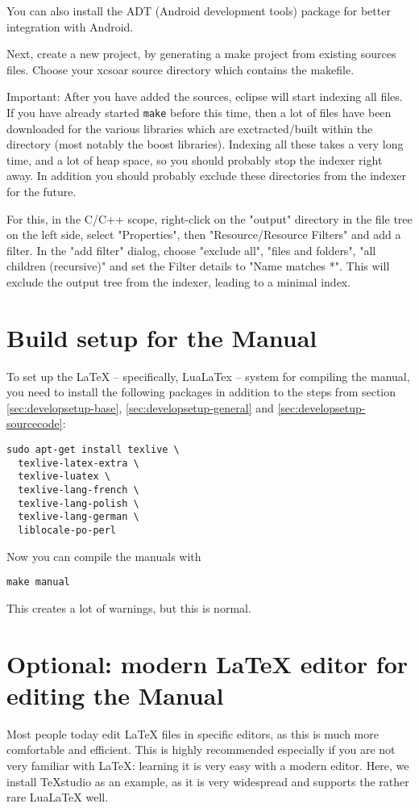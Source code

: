 You can also install the ADT (Android development tools) package for better integration with Android.

Next, create a new project, by generating a make project from existing sources files. Choose your xcsoar source directory which contains the makefile.

Important: After you have added the sources, eclipse will start indexing all files. If you have already started \texttt{make} before this time, then a lot of files have been downloaded for the various libraries which are exctracted/built within the \xc directory (most notably the boost libraries). Indexing all these takes a very long time, and a lot of heap space, so you should probably stop the indexer right away. In addition you should probably exclude these directories from the indexer for the future.

For this, in the C/C++ scope, right-click on the "output" directory in the file tree on the left side, select "Properties", then "Resource/Resource Filters" and add a filter. In the "add filter" dialog, choose "exclude all", "files and folders", "all children (recursive)" and set the Filter details to "Name matches *".
This will exclude the output tree from the indexer, leading to a minimal index.

\section{Build setup for the Manual}
To set up the LaTeX -- specifically, LuaLaTex -- system for compiling the manual, you need to install the following packages in addition to the steps from section \ref{sec:developsetup-base}, \ref{sec:developsetup-general} and \ref{sec:developsetup-sourcecode}:

\begin{verbatim}
sudo apt-get install texlive \
  texlive-latex-extra \
  texlive-luatex \
  texlive-lang-french \
  texlive-lang-polish \
  texlive-lang-german \
  liblocale-po-perl
\end{verbatim}

Now you can compile the manuals with 

\begin{verbatim}
make manual
\end{verbatim}

This creates a lot of warnings, but this is normal.

\section{Optional: modern LaTeX editor for editing the Manual}
Most people today edit LaTeX files in specific editors, as this is much more comfortable and efficient. This is highly recommended especially if you are not very familiar with LaTeX: learning it is very easy with a modern editor. Here, we install TeXstudio as an example, as it is very widespread and supports the rather rare LuaLaTeX well.

